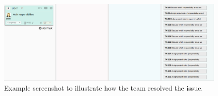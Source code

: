 \begin{figure}[H]
\includegraphics[width=\textwidth]{ch/devProcess/fig/addsTasks.png}
\caption{Example screenshot to illustrate how the team resolved the issue.}
\label{fig:addsTasks}
\end{figure}